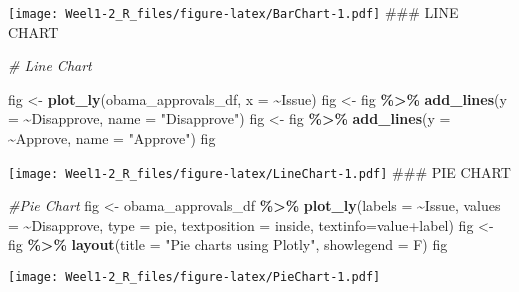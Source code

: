 \documentclass[
]{article}
\newenvironment{Shaded}{\begin{snugshade}}{\end{snugshade}}
\newcommand{\AttributeTok}[1]{\textcolor[rgb]{0.13,0.29,0.53}{#1}}
\newcommand{\CommentTok}[1]{\textcolor[rgb]{0.56,0.35,0.01}{\textit{#1}}}
\newcommand{\FunctionTok}[1]{\textcolor[rgb]{0.13,0.29,0.53}{\textbf{#1}}}
\newcommand{\NormalTok}[1]{#1}
\newcommand{\OtherTok}[1]{\textcolor[rgb]{0.56,0.35,0.01}{#1}}
\newcommand{\SpecialCharTok}[1]{\textcolor[rgb]{0.81,0.36,0.00}{\textbf{#1}}}
\newcommand{\StringTok}[1]{\textcolor[rgb]{0.31,0.60,0.02}{#1}}
\begin{document}
\texttt{[image: Weel1-2\_R\_files/figure-latex/BarChart-1.pdf]} \#\#\#
LINE CHART

\begin{Shaded}
\begin{Highlighting}[]
\CommentTok{\# Line Chart}

\NormalTok{fig }\OtherTok{\textless{}{-}} \FunctionTok{plot\_ly}\NormalTok{(obama\_approvals\_df, }\AttributeTok{x =} \SpecialCharTok{\textasciitilde{}}\NormalTok{Issue) }
\NormalTok{fig }\OtherTok{\textless{}{-}}\NormalTok{ fig }\SpecialCharTok{\%\textgreater{}\%} \FunctionTok{add\_lines}\NormalTok{(}\AttributeTok{y =} \SpecialCharTok{\textasciitilde{}}\NormalTok{Disapprove, }\AttributeTok{name =} \StringTok{"Disapprove"}\NormalTok{)}
\NormalTok{fig }\OtherTok{\textless{}{-}}\NormalTok{ fig }\SpecialCharTok{\%\textgreater{}\%} \FunctionTok{add\_lines}\NormalTok{(}\AttributeTok{y =} \SpecialCharTok{\textasciitilde{}}\NormalTok{Approve, }\AttributeTok{name =} \StringTok{"Approve"}\NormalTok{) }
\NormalTok{fig}
\end{Highlighting}
\end{Shaded}

\texttt{[image: Weel1-2\_R\_files/figure-latex/LineChart-1.pdf]} \#\#\#
PIE CHART

\begin{Shaded}
\begin{Highlighting}[]
\CommentTok{\#Pie Chart}
\NormalTok{fig }\OtherTok{\textless{}{-}}\NormalTok{ obama\_approvals\_df }\SpecialCharTok{\%\textgreater{}\%} \FunctionTok{plot\_ly}\NormalTok{(}\AttributeTok{labels =} \SpecialCharTok{\textasciitilde{}}\NormalTok{Issue, }\AttributeTok{values =} \SpecialCharTok{\textasciitilde{}}\NormalTok{Disapprove,}
                                      \AttributeTok{type =} \StringTok{\textquotesingle{}pie\textquotesingle{}}\NormalTok{, }\AttributeTok{textposition =} \StringTok{\textquotesingle{}inside\textquotesingle{}}\NormalTok{, }
                                      \AttributeTok{textinfo=}\StringTok{\textquotesingle{}value+label\textquotesingle{}}\NormalTok{)}
\NormalTok{fig }\OtherTok{\textless{}{-}}\NormalTok{ fig }\SpecialCharTok{\%\textgreater{}\%} \FunctionTok{layout}\NormalTok{(}\AttributeTok{title =} \StringTok{"Pie charts using Plotly"}\NormalTok{,  }\AttributeTok{showlegend =}\NormalTok{ F) }
\NormalTok{fig}
\end{Highlighting}
\end{Shaded}

\texttt{[image: Weel1-2\_R\_files/figure-latex/PieChart-1.pdf]}
\end{document}
